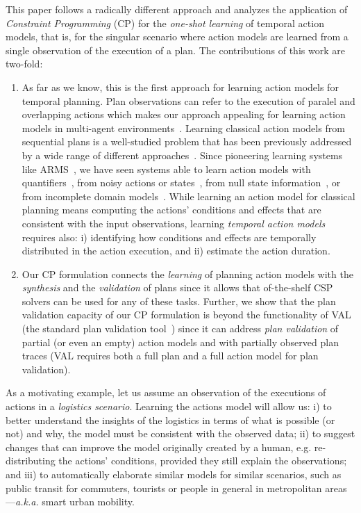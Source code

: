\documentclass{ecai}
\begin{document}
This paper follows a radically different approach and analyzes the application of {\em Constraint Programming} (CP) for the {\em one-shot learning} of temporal action models, that is, for the singular scenario where action models are learned from a single observation of the execution of a plan. The contributions of this work are two-fold:
\begin{enumerate}  
\item As far as we know, this is the first approach for learning action models for temporal planning. Plan observations can refer to the execution of paralel and overlapping actions which makes our approach appealing for learning action models in multi-agent environments~\cite{furelos2018carpool}. Learning classical action models from sequential plans is a well-studied problem that has been previously addressed by a wide range of different approaches~\cite{arora2018review}. Since pioneering learning systems like ARMS~\cite{yang2007learning}, we have seen systems able to learn action models with quantifiers~\cite{AmirC08,ZhuoYHL10}, from noisy actions or states~\cite{MouraoZPS12,zhuo2013action}, from null state information~\cite{cresswell2013}, or from incomplete domain models~\cite{ZhuoK17,ZhuoNK13}. While learning an action model for classical planning means computing the actions' conditions and effects that are consistent with the input observations, learning {\em temporal action models} requires also: i) identifying how conditions and effects are temporally distributed in the action execution, and ii) estimate the action duration. 
\item Our CP formulation connects the {\em learning} of planning action models with the {\em synthesis} and the {\em validation} of plans since it allows that of-the-shelf CSP solvers can be used for any of these tasks. Further, we show that the plan validation capacity of our CP formulation is beyond the functionality of VAL (the standard plan validation tool~\cite{howey2004val}) since it can address {\em plan validation} of partial (or even an empty) action models and with partially observed plan traces (VAL requires both a full plan and a full action model for plan validation). 
\end{enumerate}

As a motivating example, let us assume an observation of the executions of actions in a {\em logistics scenario}. Learning the actions model will allow us: i) to better understand the insights of the logistics in terms of what is possible (or not) and why, the model must be consistent with the observed data; ii) to suggest changes that can improve the model originally created by a human, e.g. re-distributing the actions' conditions, provided they still explain the observations; and iii) to automatically elaborate similar models for similar scenarios, such as public transit for commuters, tourists or people in general in metropolitan areas ---\emph{a.k.a.} smart urban mobility.
\end{document}
